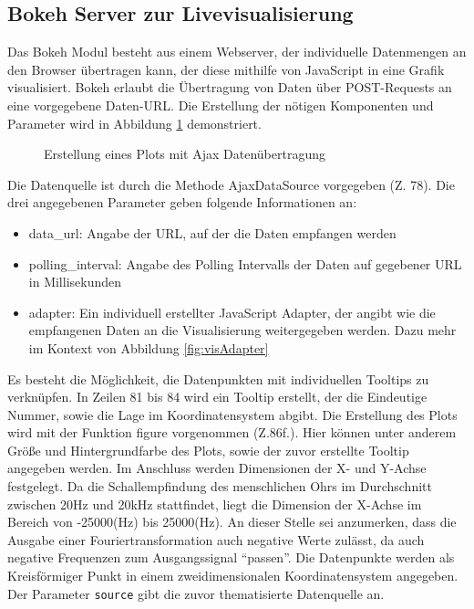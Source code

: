 \subsection{Bokeh Server zur Livevisualisierung}
\label{sec:bokeh}
Das Bokeh Modul besteht aus einem Webserver, der individuelle Datenmengen an den Browser übertragen kann, der diese mithilfe von JavaScript in eine Grafik visualisiert. Bokeh erlaubt die Übertragung von Daten über POST-Requests an eine vorgegebene Daten-URL. Die Erstellung der nötigen Komponenten und Parameter wird in Abbildung \ref{fig:bokehPlot} demonstriert.

\begin{figure}[t!]
	
	\caption{Erstellung eines Plots mit Ajax Datenübertragung}
	\label{fig:bokehPlot}
\end{figure}

Die Datenquelle ist durch die Methode AjaxDataSource vorgegeben (Z. 78). Die drei angegebenen Parameter geben folgende Informationen an:

\begin{itemize}
	\item data\_url: Angabe der URL, auf der die Daten empfangen werden
	\item polling\_interval: Angabe des Polling Intervalls der Daten auf gegebener URL in Millisekunden
	\item adapter: Ein individuell erstellter JavaScript Adapter, der angibt wie die empfangenen Daten an die Visualisierung weitergegeben werden. Dazu mehr im Kontext von Abbildung \ref{fig:visAdapter}
\end{itemize}

Es besteht die Möglichkeit, die Datenpunkten mit individuellen Tooltips zu verknüpfen. In Zeilen 81 bis 84 wird ein Tooltip erstellt, der die Eindeutige Nummer, sowie die Lage im Koordinatensystem abgibt.
Die Erstellung des Plots wird mit der Funktion figure vorgenommen (Z.86f.). Hier können unter anderem Größe und Hintergrundfarbe des Plots, sowie der zuvor erstellte Tooltip angegeben werden. Im Anschluss werden Dimensionen der X- und Y-Achse festgelegt. Da die Schallempfindung des menschlichen Ohrs im Durchschnitt zwischen 20Hz und 20kHz stattfindet, liegt die Dimension der X-Achse im Bereich von -25000(Hz) bis 25000(Hz). An dieser Stelle sei anzumerken, dass die Ausgabe einer Fouriertransformation auch negative Werte zulässt, da auch negative Frequenzen zum Ausgangssignal \enquote{passen}. Die Datenpunkte werden als Kreisförmiger Punkt in einem zweidimensionalen Koordinatensystem angegeben. Der Parameter \texttt{source} gibt die zuvor thematisierte Datenquelle an.

